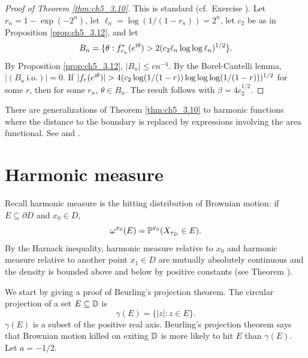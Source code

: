 \begin{proof}[Proof of Theorem \ref{thm:ch5_3.10}]
This is standard (cf.\ Exercise ). Let $r_n = 1-\exp(-2^n)$, let $\ell_n = \log(1/(1-r_n)) = 2^n$, let $c_2$ be as in Proposition \ref{prop:ch5_3.12}, and let
\[
    B_n = \{\theta : f_{r_n}^*(e^{\im\theta}) > 2(c_2\ell_n\log\log\ell_n)^{1/2}\}.
\]
By Proposition \ref{prop:ch5_3.12}, $|B_n| \leq cn^{-4}$. By the Borel-Cantelli lemma, $|(B_n~\text{i.o.})|\allowbreak = 0$. If $|f_r(e^{\im\theta})| > 4(c_2\log(1/(1-r))\log\log\log(1/(1-r)))^{1/2}$ for some $r$, then for some $r_n$, $\theta \in B_n$. The result follows with $\beta = 4c_2^{1/2}$.
\end{proof}

There are generalizations of Theorem \ref{thm:ch5_3.10} to harmonic functions where the distance to the boundary is replaced by expressions involving the area functional. See \cite{BanuelosKlemesMoore1988,BanuelosKlemesMoore1990} and \cite{BanuelosMoore1989a,BanuelosMoore1989b}.


\section{Harmonic measure}\label{ch5_sec4}


Recall harmonic measure is the hitting distribution of Brownian motion: if $E \subseteq \partial D$ and $x_0 \in D$,
\begin{equation}\label{eq:ch5_4.1}
    \omega^{x_0}(E) = \P^{x_0}(X_{\tau_D} \in E).
\end{equation}
By the Harnack inequality, harmonic measure relative to $x_0$ and harmonic measure relative to another point $x_1 \in D$ are mutually absolutely continuous and the density is bounded above and below by positive constants (see Theorem ).

\mpagebreak

We start by giving a proof of Beurling's projection theorem. The circular projection of a set $E \subseteq \D$ is
\begin{equation}\label{eq:ch5_4.2}
    \gamma(E) = \{|z| : z \in E\}.
\end{equation}
$\gamma(E)$ is a subset of the positive real axis. Beurling's projection theorem says that Brownian motion killed on exiting $\D$ is more likely to hit $E$ than $\gamma(E)$. Let $a = -1/2$.

